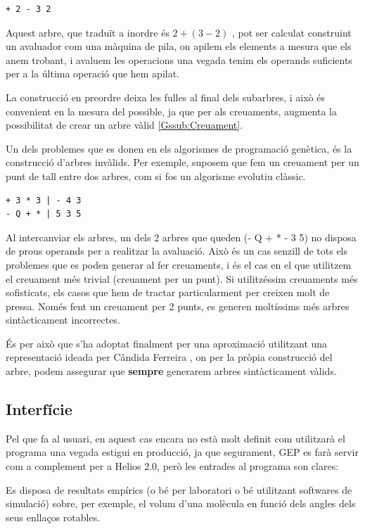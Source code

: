 \begin{verbatim}
+ 2 - 3 2
\end{verbatim}

Aquest arbre, que traduït a inordre és $ 2 + (3 -2) $ , pot ser calculat
construint un avaluador com una màquina de pila, on apilem els elements a mesura
que els anem trobant, i avaluem les operacions una vegada tenim els operands
suficients per a la última operació que hem apilat.

La construcció en preordre deixa les fulles al final dels subarbres, i això és
convenient en la mesura del possible, ja que per als creuaments, augmenta la
possibilitat de crear un arbre vàlid \ref{Gssub:Creuament}.

Un dels problemes que es donen en els algorismes de programació genètica, és la
construcció d'arbres invàlids. Per exemple, suposem que fem un creuament per un
punt de tall entre dos arbres, com si fos un algorisme evolutiu clàssic.

\begin{verbatim}
+ 3 * 3 | - 4 3
- Q + * | 5 3 5
\end{verbatim}

Al intercanviar els arbres, un dels 2 arbres que queden (- Q + * - 3 5) no
disposa de prous operands per a realitzar la avaluació.  Això és un cas senzill
de tots els problemes que es poden generar al fer creuaments, i és el cas en el
que utilitzem el creuament més trivial (creuament per un punt). Si utilitzéssim
creuaments més sofisticats, els casos que hem de tractar particularment per
creixen molt de pressa.  Només fent un creuament per 2 punts, es generen
moltíssims més arbres sintàcticament incorrectes.

És per això que s'ha adoptat finalment per una aproximació utilitzant una
representació ideada per Cândida Ferreira \cite{ferreira:2007}, on per la pròpia
construcció del arbre, podem assegurar que \textbf{sempre} generarem arbres
sintàcticament vàlids.

\subsection{Interfície} %
\label{sub:Interficie}

Pel que fa al usuari, en aquest cas encara no està molt definit com utilitzarà
el programa una vegada estigui en producció, ja que segurament, GEP es farà
servir com a complement per a Helios 2.0, però les entrades al programa son
clares:

Es disposa de resultats empírics (o bé per laboratori o bé utilitzant softwares
de simulació) sobre, per exemple, el volum d'una molècula en funció dels angles
dels seus enllaços rotables.

